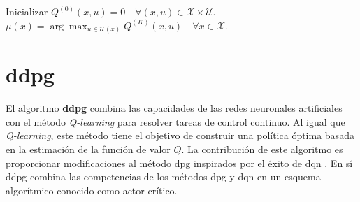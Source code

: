 \begin{algorithm}[h]
    \caption{\textit{Q-learning} con política $\epsilon$-\textit{greedy}\cite{Sutton2018}}
    \label{alg:q_learning}
    \KwData{$\alpha \in (0,1]$, $\gamma \in [0,1)$, $\epsilon_0 \in (0,1)$, $K \in \mathbb{N}$, espacios $\mathcal{X}$ y $\mathcal{U}(x)\subseteq\mathcal{U}$.}
    Inicializar $Q^{(0)}(x,u) = 0 \quad \forall (x,u) \in \mathcal{X} \times \mathcal{U}$. \\
    $\mu(x) = \arg\max_{u\in\mathcal{U}(x)}Q^{(K)}(x,u) \quad \forall x \in \mathcal{X}$.
\end{algorithm}

\section{\acrlong{ddpg}}
\label{sec:DDPG}

El algoritmo \textbf{\acrfull{ddpg}} \cite{lillicrap2015continuous} combina las capacidades de las redes neuronales artificiales con el método \textit{Q-learning} para resolver tareas de control continuo. Al igual que \textit{Q-learning}, este método tiene el objetivo de construir una política óptima basada en la estimación de la función de valor $Q$. La contribución de este algoritmo es proporcionar modificaciones al método \acrfull{dpg} inspirados por el éxito de \acrfull{dqn} \cite{lillicrap2015continuous}. En sí \acrshort{ddpg} combina las competencias de los métodos \acrshort{dpg} y \acrshort{dqn} en un esquema algorítmico conocido como actor-crítico.

